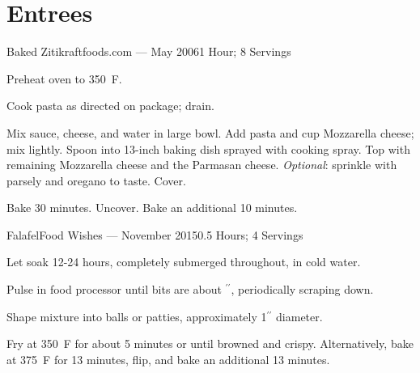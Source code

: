 \documentclass{article}
\begin{document}
\section{Entrees}

\begin{recipe}{Baked Ziti}{kraftfoods.com --- May 2006}{1 Hour; 8 Servings}

   \newstep
   Preheat oven to 350\ \0F.

   Cook pasta as directed on package; drain.

   Mix sauce, cheese, and water in large bowl.  Add pasta and  cup
   Mozzarella cheese; mix lightly.  Spoon into 13-inch baking dish sprayed
   with cooking spray.  Top with remaining Mozzarella cheese and the Parmasan
   cheese.  \emph{Optional}: sprinkle with parsely and oregano to taste.  Cover.

   \newstep
   Bake 30 minutes. Uncover.  Bake an additional 10 minutes.

\end{recipe}

\begin{recipe}{Falafel}{Food Wishes --- November 2015}{0.5 Hours; 4 Servings}

   Let soak 12-24 hours, completely submerged throughout, in cold water.

   Pulse in food processor until bits are about $^{\prime\prime}$,
   periodically scraping down.

   \newstep
   Shape mixture into balls or patties, approximately 1$^{\prime\prime}$
   diameter. 

   \newstep
   Fry at 350\ \0F for about 5 minutes or until browned and crispy.
   Alternatively, bake at 375\ \0F for 13 minutes, flip, and bake an additional
   13 minutes.

\end{recipe}
\end{document}
